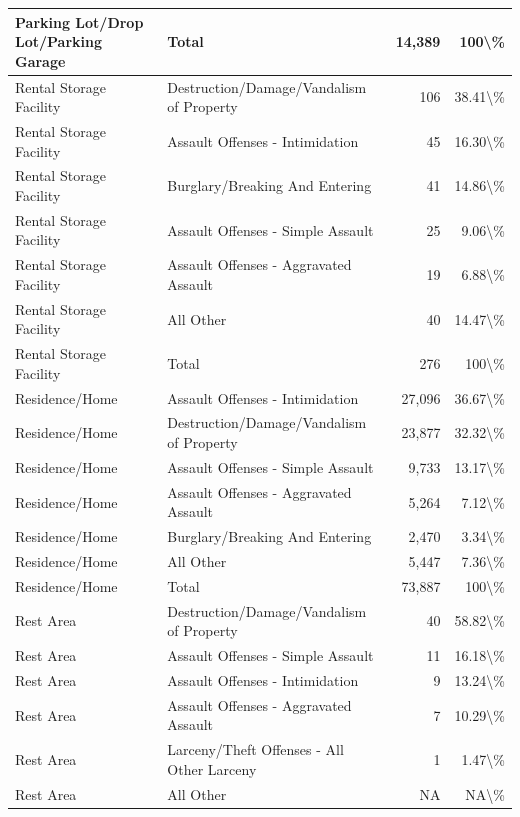 \documentclass[
]{krantz}
\begin{document}
\begin{longtable}[t]{l|l|r|r}
\hline
Parking Lot/Drop Lot/Parking Garage & Total & 14,389 & 100\textbackslash{}\%\\
\hline
Rental Storage Facility & Destruction/Damage/Vandalism of Property & 106 & 38.41\textbackslash{}\%\\
\hline
Rental Storage Facility & Assault Offenses - Intimidation & 45 & 16.30\textbackslash{}\%\\
\hline
Rental Storage Facility & Burglary/Breaking And Entering & 41 & 14.86\textbackslash{}\%\\
\hline
Rental Storage Facility & Assault Offenses - Simple Assault & 25 & 9.06\textbackslash{}\%\\
\hline
Rental Storage Facility & Assault Offenses - Aggravated Assault & 19 & 6.88\textbackslash{}\%\\
\hline
Rental Storage Facility & All Other & 40 & 14.47\textbackslash{}\%\\
\hline
Rental Storage Facility & Total & 276 & 100\textbackslash{}\%\\
\hline
Residence/Home & Assault Offenses - Intimidation & 27,096 & 36.67\textbackslash{}\%\\
\hline
Residence/Home & Destruction/Damage/Vandalism of Property & 23,877 & 32.32\textbackslash{}\%\\
\hline
Residence/Home & Assault Offenses - Simple Assault & 9,733 & 13.17\textbackslash{}\%\\
\hline
Residence/Home & Assault Offenses - Aggravated Assault & 5,264 & 7.12\textbackslash{}\%\\
\hline
Residence/Home & Burglary/Breaking And Entering & 2,470 & 3.34\textbackslash{}\%\\
\hline
Residence/Home & All Other & 5,447 & 7.36\textbackslash{}\%\\
\hline
Residence/Home & Total & 73,887 & 100\textbackslash{}\%\\
\hline
Rest Area & Destruction/Damage/Vandalism of Property & 40 & 58.82\textbackslash{}\%\\
\hline
Rest Area & Assault Offenses - Simple Assault & 11 & 16.18\textbackslash{}\%\\
\hline
Rest Area & Assault Offenses - Intimidation & 9 & 13.24\textbackslash{}\%\\
\hline
Rest Area & Assault Offenses - Aggravated Assault & 7 & 10.29\textbackslash{}\%\\
\hline
Rest Area & Larceny/Theft Offenses - All Other Larceny & 1 & 1.47\textbackslash{}\%\\
\hline
Rest Area & All Other & NA & NA\textbackslash{}\%\\

\end{longtable}
\end{document}
